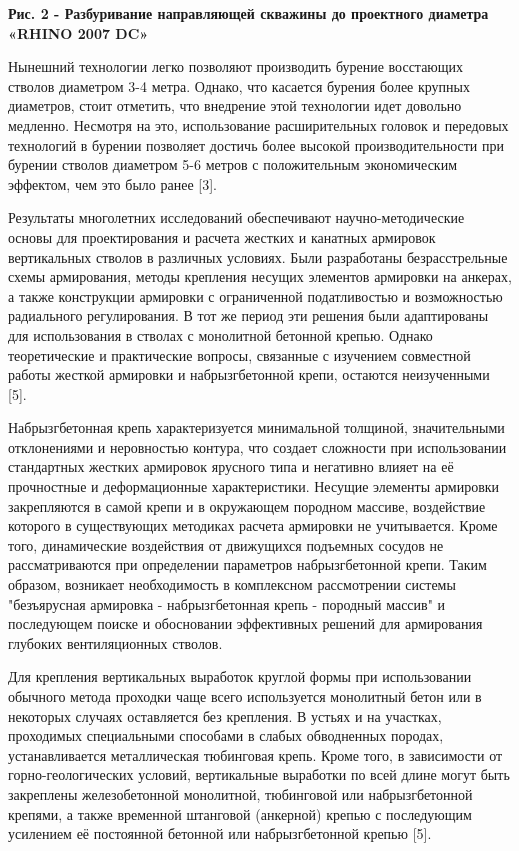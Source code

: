 {\bfseries Рис. 2 - Разбуривание направляющей скважины до проектного
диаметра «RHINO 2007 DC»}

Нынешний технологии легко позволяют производить бурение восстающих
стволов диаметром 3-4 метра. Однако, что касается бурения более крупных
диаметров, стоит отметить, что внедрение этой технологии идет довольно
медленно. Несмотря на это, использование расширительных головок и
передовых технологий в бурении позволяет достичь более высокой
производительности при бурении стволов диаметром 5-6 метров с
положительным экономическим эффектом, чем это было ранее {[}3{]}.

Результаты многолетних исследований обеспечивают научно-методические
основы для проектирования и расчета жестких и канатных армировок
вертикальных стволов в различных условиях. Были разработаны
безрасстрельные схемы армирования, методы крепления несущих элементов
армировки на анкерах, а также конструкции армировки с ограниченной
податливостью и возможностью радиального регулирования. В тот же период
эти решения были адаптированы для использования в стволах с монолитной
бетонной крепью. Однако теоретические и практические вопросы, связанные
с изучением совместной работы жесткой армировки и набрызгбетонной крепи,
остаются неизученными {[}5{]}.

Набрызгбетонная крепь характеризуется минимальной толщиной,
значительными отклонениями и неровностью контура, что создает сложности
при использовании стандартных жестких армировок ярусного типа и
негативно влияет на её прочностные и деформационные характеристики.
Несущие элементы армировки закрепляются в самой крепи и в окружающем
породном массиве, воздействие которого в существующих методиках расчета
армировки не учитывается. Кроме того, динамические воздействия от
движущихся подъемных сосудов не рассматриваются при определении
параметров набрызгбетонной крепи. Таким образом, возникает необходимость
в комплексном рассмотрении системы "безъярусная армировка -
набрызгбетонная крепь - породный массив" и последующем поиске и
обосновании эффективных решений для армирования глубоких вентиляционных
стволов.

Для крепления вертикальных выработок круглой формы при использовании
обычного метода проходки чаще всего используется монолитный бетон или в
некоторых случаях оставляется без крепления. В устьях и на участках,
проходимых специальными способами в слабых обводненных породах,
устанавливается металлическая тюбинговая крепь. Кроме того, в
зависимости от горно-геологических условий, вертикальные выработки по
всей длине могут быть закреплены железобетонной монолитной, тюбинговой
или набрызгбетонной крепями, а также временной штанговой (анкерной)
крепью с последующим усилением её постоянной бетонной или
набрызгбетонной крепью {[}5{]}.

